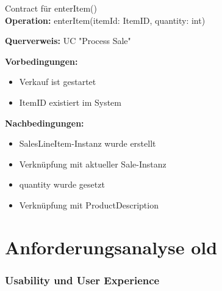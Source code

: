 \begin{example2}{Contract für enterItem()}\\
\textbf{Operation:} enterItem(itemId: ItemID, quantity: int)

\textbf{Querverweis:} UC "Process Sale"

\textbf{Vorbedingungen:}
\begin{itemize}
    \item Verkauf ist gestartet
    \item ItemID existiert im System
\end{itemize}

\textbf{Nachbedingungen:}
\begin{itemize}
    \item SalesLineItem-Instanz wurde erstellt
    \item Verknüpfung mit aktueller Sale-Instanz
    \item quantity wurde gesetzt
    \item Verknüpfung mit ProductDescription
\end{itemize}
\end{example2}

\pagebreak

\section{Anforderungsanalyse old}

\subsubsection{Usability und User Experience}

